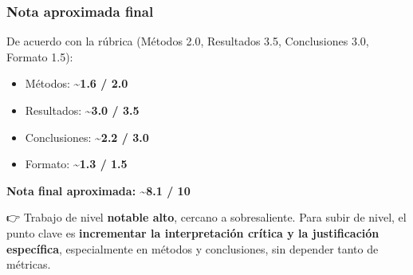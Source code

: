 \documentclass[
  11pt,
  a4paper,
  twoside]{scrreprt}
\begin{document}
\subsubsection{Nota aproximada final}\label{nota-aproximada-final}

De acuerdo con la rúbrica (Métodos 2.0, Resultados 3.5, Conclusiones
3.0, Formato 1.5):

\begin{itemize}
\item
  Métodos: \textbf{\textasciitilde1.6 / 2.0}
\item
  Resultados: \textbf{\textasciitilde3.0 / 3.5}
\item
  Conclusiones: \textbf{\textasciitilde2.2 / 3.0}
\item
  Formato: \textbf{\textasciitilde1.3 / 1.5}
\end{itemize}

\textbf{Nota final aproximada: \textasciitilde8.1 / 10}

👉 Trabajo de nivel \textbf{notable alto}, cercano a sobresaliente. Para
subir de nivel, el punto clave es \textbf{incrementar la interpretación
crítica y la justificación específica}, especialmente en métodos y
conclusiones, sin depender tanto de métricas.

\clearpage
\thispagestyle{empty}
\end{document}
